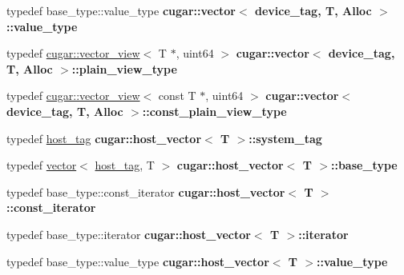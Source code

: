 \begin{DoxyCompactItemize}
\item 
\mbox{\label{group___basic_gab30da5faa2fe00188500729099e25d5b}} 
typedef base\+\_\+type\+::value\+\_\+type {\bfseries cugar\+::vector$<$ device\+\_\+tag, T, Alloc $>$\+::value\+\_\+type}
\item 
\mbox{\label{group___basic_ga366c25f0dd84cc8f44d143262d9aa944}} 
typedef \hyperlink{structcugar_1_1vector__view}{cugar\+::vector\+\_\+view}$<$ T $\ast$, uint64 $>$ {\bfseries cugar\+::vector$<$ device\+\_\+tag, T, Alloc $>$\+::plain\+\_\+view\+\_\+type}
\item 
\mbox{\label{group___basic_ga407abd20e61f6e51afac372ff1b395d6}} 
typedef \hyperlink{structcugar_1_1vector__view}{cugar\+::vector\+\_\+view}$<$ const T $\ast$, uint64 $>$ {\bfseries cugar\+::vector$<$ device\+\_\+tag, T, Alloc $>$\+::const\+\_\+plain\+\_\+view\+\_\+type}
\item 
\mbox{\label{group___basic_ga4248dced88045891013ee29a079307f2}} 
typedef \hyperlink{structcugar_1_1host__tag}{host\+\_\+tag} {\bfseries cugar\+::host\+\_\+vector$<$ T $>$\+::system\+\_\+tag}
\item 
\mbox{\label{group___basic_ga99decbec58aa8f898c62828f1c77e673}} 
typedef \hyperlink{structcugar_1_1vector}{vector}$<$ \hyperlink{structcugar_1_1host__tag}{host\+\_\+tag}, T $>$ {\bfseries cugar\+::host\+\_\+vector$<$ T $>$\+::base\+\_\+type}
\item 
\mbox{\label{group___basic_gacd76a3e2093433383e323e7e99f0f111}} 
typedef base\+\_\+type\+::const\+\_\+iterator {\bfseries cugar\+::host\+\_\+vector$<$ T $>$\+::const\+\_\+iterator}
\item 
\mbox{\label{group___basic_ga2d30c0f8ec33f364c1438fd575448d91}} 
typedef base\+\_\+type\+::iterator {\bfseries cugar\+::host\+\_\+vector$<$ T $>$\+::iterator}
\item 
\mbox{\label{group___basic_gab05f8c36b6754e315317e6ee739f9581}} 
typedef base\+\_\+type\+::value\+\_\+type {\bfseries cugar\+::host\+\_\+vector$<$ T $>$\+::value\+\_\+type}
\item 
\mbox{\label{group___basic_ga04058c3de29c32a8d43cad68a5d9fd92}} 

\end{DoxyCompactItemize}
